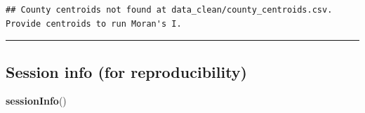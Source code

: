 \documentclass[
  11pt,
]{article}
\newenvironment{Shaded}{\begin{snugshade}}{\end{snugshade}}
\newcommand{\FunctionTok}[1]{\textcolor[rgb]{0.13,0.29,0.53}{\textbf{#1}}}
\newcommand{\NormalTok}[1]{#1}
\begin{document}
\begin{verbatim}
## County centroids not found at data_clean/county_centroids.csv. Provide centroids to run Moran's I.
\end{verbatim}

\begin{center}\rule{0.5\linewidth}{0.5pt}\end{center}

\subsection{Session info (for
reproducibility)}\label{session-info-for-reproducibility}

\begin{Shaded}
\begin{Highlighting}[]
\FunctionTok{sessionInfo}\NormalTok{()}
\end{Highlighting}
\end{Shaded}
\end{document}
